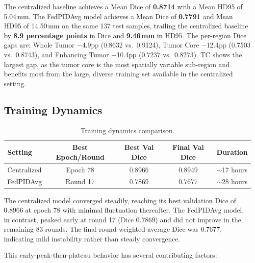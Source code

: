 \documentclass{article}
\begin{document}
The centralized baseline achieves a Mean Dice of \textbf{0.8714} with a Mean HD95 of 5.04\,mm. The FedPIDAvg model achieves a Mean Dice of \textbf{0.7791} and Mean HD95 of 14.50\,mm on the same 137 test samples, trailing the centralized baseline by \textbf{8.9 percentage points} in Dice and \textbf{9.46\,mm} in HD95. The per-region Dice gaps are: Whole Tumor $-$4.9pp (0.8632 vs.\ 0.9124), Tumor Core $-$12.4pp (0.7503 vs.\ 0.8743), and Enhancing Tumor $-$10.4pp (0.7237 vs.\ 0.8273). TC shows the largest gap, as the tumor core is the most spatially variable sub-region and benefits most from the large, diverse training set available in the centralized setting.

\subsection{Training Dynamics}

\begin{table}[h]
\centering
\begin{tabular}{lcccc}
\toprule
\textbf{Setting} & \textbf{Best Epoch/Round} & \textbf{Best Val Dice} & \textbf{Final Val Dice} & \textbf{Duration} \\
\midrule
Centralized & Epoch 78 & 0.8966 & 0.8949 & $\sim$17 hours \\
FedPIDAvg & Round 17 & 0.7869 & 0.7677 & $\sim$28 hours \\
\bottomrule
\end{tabular}
\caption{Training dynamics comparison.}
\label{tab:training}
\end{table}

The centralized model converged steadily, reaching its best validation Dice of 0.8966 at epoch 78 with minimal fluctuation thereafter. The FedPIDAvg model, in contrast, peaked early at round 17 (Dice 0.7869) and did not improve in the remaining 83 rounds. The final-round weighted-average Dice was 0.7677, indicating mild instability rather than steady convergence.

This early-peak-then-plateau behavior has several contributing factors:
\end{document}
